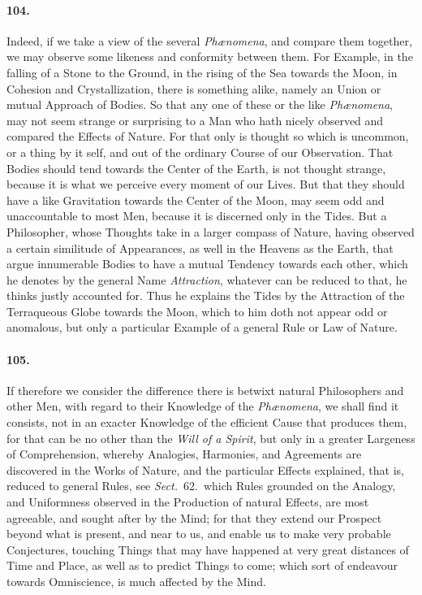 \documentclass[]{article}
\newenvironment{sectionbody}{\begin{multicols}{2}}{\end{multicols}}
\begin{document}
\begin{sectionbody}
\paragraph{104.} Indeed, if we take a view of the several
\emph{Ph{\ae}nomena}, and compare them together, we may
observe some likeness and conformity between them.  For Example,
in the falling of a Stone to the Ground, in the rising of the Sea
towards the Moon, in Cohesion and Crystallization, there is
something alike, namely an Union or mutual Approach of Bodies.
So that any one of these or the like \emph{Ph{\ae}nomena},
may not seem strange or surprising to a Man who hath nicely
observed and compared the Effects of Nature.  For that only is
thought so which is uncommon, or a thing by it self, and out of
the ordinary Course of our Observation.  That Bodies should tend
towards the Center of the Earth, is not thought strange, because
it is what we perceive every moment of our Lives.  But that they
should have a like Gravitation towards the Center of the Moon,
may seem odd and unaccountable to most Men, because it is
discerned only in the Tides.  But a Philosopher, whose Thoughts
take in a larger compass of Nature, having observed a certain
similitude of Appearances, as well in the Heavens as the Earth,
that argue innumerable Bodies to have a mutual Tendency towards
each other, which he denotes by the general Name
\emph{Attraction}, whatever can be reduced to that, he thinks
justly accounted for.  Thus he explains the Tides by the
Attraction of the Terraqueous Globe towards the Moon, which to
him doth not appear odd or anomalous, but only a particular
Example of a general Rule or Law of Nature.



\paragraph{105.} If therefore we consider the difference there is betwixt natural
Philosophers and other Men, with regard to their Knowledge of the
\emph{Ph{\ae}nomena}, we shall find it consists, not in an
exacter Knowledge of the efficient Cause that produces them,  for
that can be no other than the \emph{Will of a Spirit},  but
only in a greater Largeness of Comprehension, whereby Analogies,
Harmonies, and Agreements are discovered in the Works of Nature,
and the particular Effects explained, that is, reduced to general
Rules, see \emph{Sect.}~62.\ which Rules
grounded on the Analogy, and Uniformness observed in the
Production of natural Effects, are most agreeable, and sought
after by the Mind; for that they extend our Prospect beyond what
is present, and near to us, and enable us to make very probable
Conjectures, touching Things that may have happened at very great
distances of Time and Place, as well as to predict Things to
come; which sort of endeavour towards Omniscience, is much
affected by the Mind.




\end{sectionbody}
\end{document}
